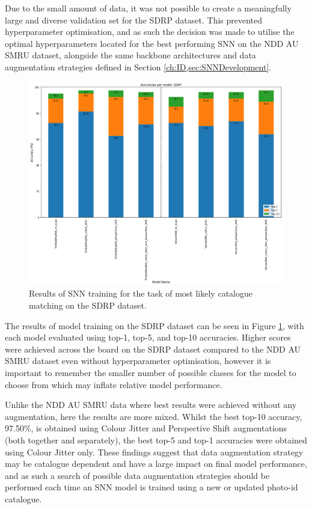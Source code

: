 Due to the small amount of data, it was not possible to create a meaningfully large and diverse validation set for the SDRP dataset. This prevented hyperparameter optimisation, and as such the decision was made to utilise the optimal hyperparameters located for the best performing SNN on the NDD AU SMRU dataset, alongside the same backbone architectures and data augmentation strategies defined in Section \ref{ch:ID,sec:SNNDevelopment}.

\begin{figure}[h]
	\begin{center}
		\includegraphics[scale=0.4]{Chapter6/figs/SDRP-normal-split-model-comparison.png}
	\end{center}
	\caption{Results of SNN training for the task of most likely catalogue matching on the SDRP dataset.}
	\label{fig:SDRP-normal-split-model-comparison}
\end{figure}

The results of model training on the SDRP dataset can be seen in Figure \ref{fig:SDRP-normal-split-model-comparison}, with each model evaluated using top-1, top-5, and top-10 accuracies.
Higher scores were achieved across the board on the SDRP dataset compared to the NDD AU SMRU dataset even without hyperparameter optimisation, however it is important to remember the smaller number of possible classes for the model to choose from which may inflate relative model performance.

Unlike the NDD AU SMRU data where best results were achieved without any augmentation, here the results are more mixed. Whilst the best top-10 accuracy, 97.50\%, is obtained using Colour Jitter and Perspective Shift augmentations (both together and separately), the best top-5 and top-1 accuracies were obtained using Colour Jitter only. These findings suggest that data augmentation strategy may be catalogue dependent and have a large impact on final model performance, and as such a search of possible data augmentation strategies should be performed each time an SNN model is trained using a new or updated photo-id catalogue. 

